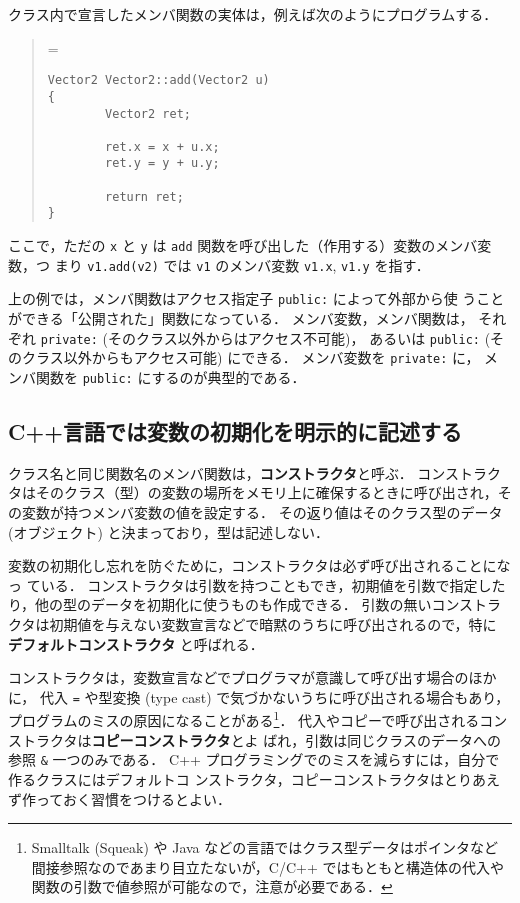 \documentclass[11pt,a4,epsf]{jarticle}
\def\linesparpage#1{\baselineskip=\textheight\divide\baselineskip#1}
\begin{document}
クラス内で宣言したメンバ関数の実体は，例えば次のようにプログラムする．
\begin{quote}
\linesparpage{50}
\begin{verbatim}
Vector2 Vector2::add(Vector2 u)
{
        Vector2 ret;

        ret.x = x + u.x;
        ret.y = y + u.y;

        return ret;
}
\end{verbatim}
\end{quote}
ここで，ただの \verb+x+ と \verb+y+ は
 \verb+add+ 関数を呼び出した（作用する）変数のメンバ変数，つ
まり \verb+v1.add(v2)+ では \verb+v1+ のメンバ変数 \verb+v1.x+,
\verb+v1.y+ を指す．

上の例では，メンバ関数はアクセス指定子 \verb+public:+ によって外部から使
うことができる「公開された」関数になっている．
メンバ変数，メンバ関数は，
それぞれ \verb+private:+ (そのクラス以外からはアクセス不可能)，
あるいは \verb+public:+ (そのクラス以外からもアクセス可能) にできる．
メンバ変数を \verb+private:+ に，
メンバ関数を \verb+public:+ にするのが典型的である．


\subsection{C++言語では変数の初期化を明示的に記述する}

クラス名と同じ関数名のメンバ関数は，{\bf コンストラクタ}と呼ぶ．
コンストラクタはそのクラス（型）の変数の場所をメモリ上に確保するときに呼び出され，その変数が持つメンバ変数の値を設定する．
その返り値はそのクラス型のデータ (オブジェクト) と決まっており，型は記述しない．

変数の初期化し忘れを防ぐために，コンストラクタは必ず呼び出されることになっ
ている．
コンストラクタは引数を持つこともでき，初期値を引数で指定したり，他の型のデータを初期化に使うものも作成できる．
引数の無いコンストラクタは初期値を与えない変数宣言などで暗黙のうちに呼び出されるので，特に {\bf デフォルトコンストラクタ} と呼ばれる．

コンストラクタは，変数宣言などでプログラマが意識して呼び出す場合のほかに，
代入 \verb+=+ や型変換 (type cast) で気づかないうちに呼び出される場合もあり，プログラムのミスの原因になることがある\footnote{Smalltalk (Squeak) や Java などの言語ではクラス型データはポインタなど
間接参照なのであまり目立たないが，C/C++ ではもともと構造体の代入や関数の引数で値参照が可能なので，注意が必要である．}．
代入やコピーで呼び出されるコンストラクタは{\bf コピーコンストラクタ}とよ
ばれ，引数は同じクラスのデータへの参照 \verb+&+ 一つのみである．
C++ プログラミングでのミスを減らすには，自分で作るクラスにはデフォルトコ
ンストラクタ，コピーコンストラクタはとりあえず作っておく習慣をつけるとよい．
\end{document}
